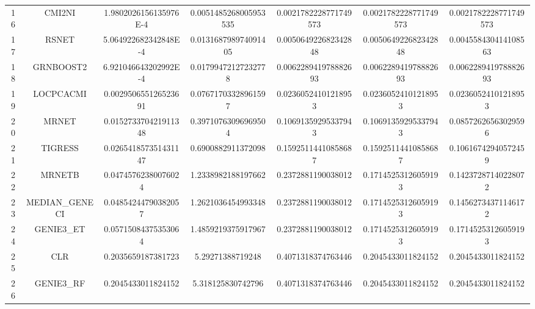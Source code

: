 \documentclass[a4paper,10pt]{article}
\begin{document}
\begin{landscape}
\begin{table}[!htp]
\begin{tabular}{ccccccc}
16&CMI2NI&1.9802026156135976E-4&0.0051485268005953535&0.0021782228771749573&0.0021782228771749573&0.0021782228771749573\\
17&RSNET&5.064922682342848E-4&0.013168798974091405&0.005064922682342848&0.005064922682342848&0.004558430414108563\\
18&GRNBOOST2&6.921046643202992E-4&0.01799472127232778&0.006228941978882693&0.006228941978882693&0.006228941978882693\\
19&LOCPCACMI&0.002950655126523691&0.07671703328961597&0.02360524101218953&0.02360524101218953&0.02360524101218953\\
20&MRNET&0.015273370421911348&0.39710763096969504&0.10691359295337943&0.10691359295337943&0.08572626563029596\\
21&TIGRESS&0.026541857351431147&0.6900882911372098&0.15925114410858687&0.15925114410858687&0.10616742940572459\\
22&MRNETB&0.04745762380076024&1.2338982188197662&0.2372881190038012&0.17145253126059193&0.14237287140228072\\
23&MEDIAN_GENECI&0.04854244790382057&1.2621036454993348&0.2372881190038012&0.17145253126059193&0.14562734371146172\\
24&GENIE3_ET&0.05715084375353064&1.4859219375917967&0.2372881190038012&0.17145253126059193&0.17145253126059193\\
25&CLR&0.2035659187381723&5.29271388719248&0.4071318374763446&0.2045433011824152&0.2045433011824152\\
26&GENIE3_RF&0.2045433011824152&5.318125830742796&0.4071318374763446&0.2045433011824152&0.2045433011824152\\
\hline
\end{tabular}
\end{table}


\end{landscape}
\end{document}
